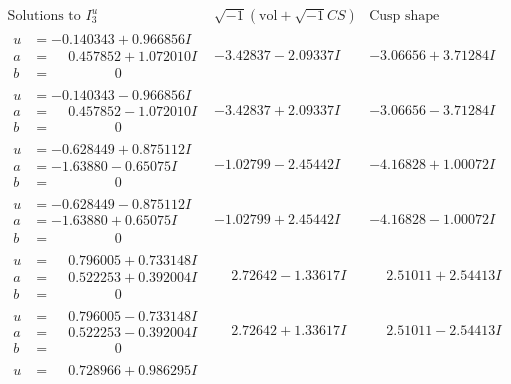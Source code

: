 \documentclass[1p]{elsarticle_modified}
\theoremstyle{definition}
\newcommand{\I}{\sqrt{-1}}
\begin{document}
$$\begin{array}{c|c|c}  
\text{Solutions to }I^u_{3}& \I (\text{vol} + \sqrt{-1}CS) & \text{Cusp shape}\\
 \hline 
\begin{aligned}
u &= -0.140343 + 0.966856 I \\
a &= \phantom{-}0.457852 + 1.072010 I \\
b &= \phantom{-0.000000 } 0\end{aligned}
 & -3.42837 - 2.09337 I & -3.06656 + 3.71284 I \\ \hline\begin{aligned}
u &= -0.140343 - 0.966856 I \\
a &= \phantom{-}0.457852 - 1.072010 I \\
b &= \phantom{-0.000000 } 0\end{aligned}
 & -3.42837 + 2.09337 I & -3.06656 - 3.71284 I \\ \hline\begin{aligned}
u &= -0.628449 + 0.875112 I \\
a &= -1.63880 - 0.65075 I \\
b &= \phantom{-0.000000 } 0\end{aligned}
 & -1.02799 - 2.45442 I & -4.16828 + 1.00072 I \\ \hline\begin{aligned}
u &= -0.628449 - 0.875112 I \\
a &= -1.63880 + 0.65075 I \\
b &= \phantom{-0.000000 } 0\end{aligned}
 & -1.02799 + 2.45442 I & -4.16828 - 1.00072 I \\ \hline\begin{aligned}
u &= \phantom{-}0.796005 + 0.733148 I \\
a &= \phantom{-}0.522253 + 0.392004 I \\
b &= \phantom{-0.000000 } 0\end{aligned}
 & \phantom{-}2.72642 - 1.33617 I & \phantom{-}2.51011 + 2.54413 I \\ \hline\begin{aligned}
u &= \phantom{-}0.796005 - 0.733148 I \\
a &= \phantom{-}0.522253 - 0.392004 I \\
b &= \phantom{-0.000000 } 0\end{aligned}
 & \phantom{-}2.72642 + 1.33617 I & \phantom{-}2.51011 - 2.54413 I \\ \hline\begin{aligned}
u &= \phantom{-}0.728966 + 0.986295 I \\

\end{aligned}
\end{array}$$
\end{document}
